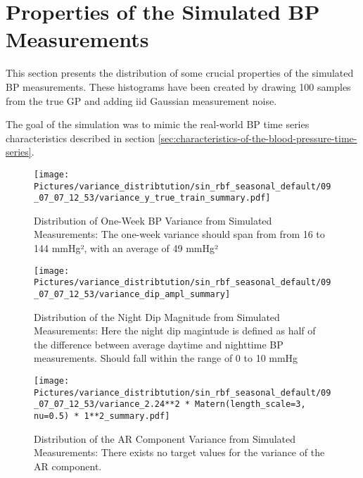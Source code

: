 \section{Properties of the Simulated BP Measurements}\label{sec:properties-of-the-simulated-time-series-samples}

This section presents the distribution of some crucial properties
of the simulated BP measurements.
These histograms have been created by drawing 100 samples from the true GP and
adding iid Gaussian measurement noise.

The goal of the simulation was to mimic the real-world BP time series
characteristics described in section \ref{sec:characteristics-of-the-blood-pressure-time-series}.

\begin{figure}[h!]
    \centering
    \texttt{[image: 
        Pictures/variance\_distribtution/sin\_rbf\_seasonal\_default/09\_07\_07\_12\_53/variance\_y\_true\_train\_summary.pdf]}
    \caption[Distribution of One-Week BP Variance from Simulated Measurements]{
        Distribution of One-Week BP Variance from Simulated Measurements:
    The one-week variance should span from from 16 to 144 mmHg², with an average of 49 mmHg²}
    \label{fig:variance}
\end{figure}

\begin{figure}[h!]
    \centering
    \texttt{[image: 
       Pictures/variance\_distribtution/sin\_rbf\_seasonal\_default/09\_07\_07\_12\_53/variance\_dip\_ampl\_summary]}
    \caption[Distribution of the Night Dip Magnitude from Simulated Measurements]{
        Distribution of the Night Dip Magnitude from Simulated Measurements:
    Here the night dip magintude is defined as half of the difference between average daytime and nighttime BP measurements.
        Should fall within the range of 0 to 10 mmHg}
    \label{fig:dip_ampl}
\end{figure}



\begin{figure}[h!]
    \centering
    \texttt{[image: 
       Pictures/variance\_distribtution/sin\_rbf\_seasonal\_default/09\_07\_07\_12\_53/variance\_2.24**2 * Matern(length\_scale=3, nu=0.5) * 1**2\_summary.pdf]}
    \caption[Distribution of the AR Component Variance from Simulated Measurements]{
    Distribution of the AR Component Variance from Simulated Measurements:
    There exists no target values for the variance of the AR component.}
    \label{fig:var_matern}
\end{figure}

